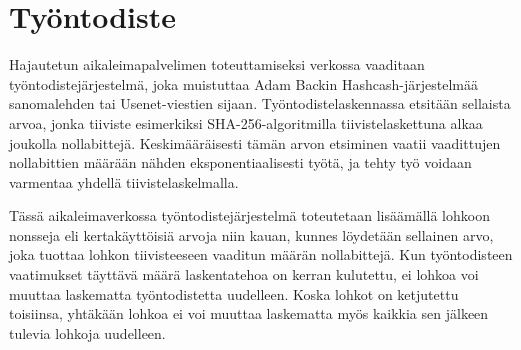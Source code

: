 \documentclass{article}
\begin{document}
\section{Työntodiste}

Hajautetun aikaleimapalvelimen toteuttamiseksi verkossa vaaditaan työn\-to\-dis\-te\-jär\-jes\-tel\-mä, joka muistuttaa Adam Backin Hashcash-järjestelmää \cite{6} sanomalehden tai Usenet-viestien sijaan. Työntodistelaskennassa etsitään sellaista arvoa, jonka tiiviste esimerkiksi SHA-256-algoritmilla tiivistelaskettuna alkaa joukolla nollabittejä. Keskimääräisesti tämän arvon etsiminen vaatii vaadittujen nollabittien määrään nähden eksponentiaalisesti työtä, ja tehty työ voidaan varmentaa yhdellä  tiivistelaskelmalla.

Tässä ai\-ka\-lei\-ma\-ver\-kos\-sa työn\-to\-dis\-te\-jär\-jes\-tel\-mä toteutetaan lisäämällä lohkoon nons\-se\-ja  eli kertakäyttöisiä arvoja niin kauan, kunnes löydetään sellainen arvo, joka tuottaa loh\-kon tiivisteeseen vaaditun määrän nollabittejä. Kun työn\-to\-dis\-teen vaatimukset täyttävä määrä laskentatehoa on kerran kulutettu, ei lohkoa voi muuttaa laskematta työntodistetta uudelleen. Koska lohkot on ketjutettu toisiinsa, yhtäkään lohkoa ei voi muuttaa laskematta myös kaikkia sen jälkeen tulevia lohkoja uudelleen.
\end{document}

